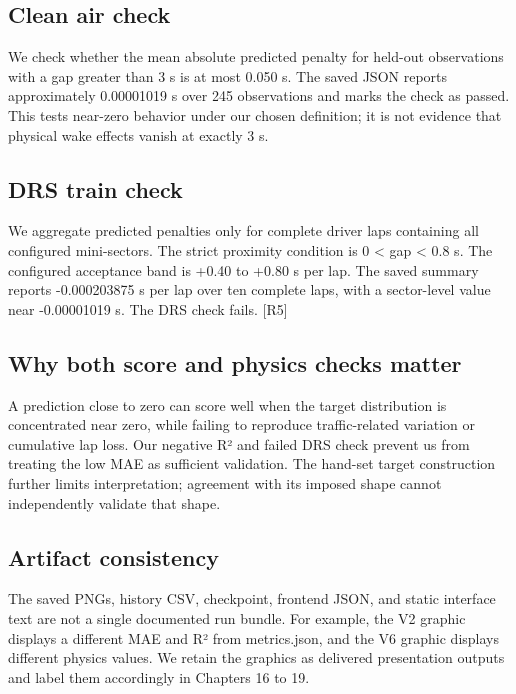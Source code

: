 \documentclass[11pt,a4paper,oneside]{report}
\begin{document}
\subsection*{Clean air check}

We check whether the mean absolute predicted penalty for held-out observations with a gap greater than 3 s is at most 0.050 s. The saved JSON reports approximately 0.00001019 s over 245 observations and marks the check as passed. This tests near-zero behavior under our chosen definition; it is not evidence that physical wake effects vanish at exactly 3 s.

\subsection*{DRS train check}

We aggregate predicted penalties only for complete driver laps containing all configured mini-sectors. The strict proximity condition is 0 < gap < 0.8 s. The configured acceptance band is +0.40 to +0.80 s per lap. The saved summary reports -0.000203875 s per lap over ten complete laps, with a sector-level value near -0.00001019 s. The DRS check fails. [R5]

\subsection*{Why both score and physics checks matter}

A prediction close to zero can score well when the target distribution is concentrated near zero, while failing to reproduce traffic-related variation or cumulative lap loss. Our negative R² and failed DRS check prevent us from treating the low MAE as sufficient validation. The hand-set target construction further limits interpretation; agreement with its imposed shape cannot independently validate that shape.

\subsection*{Artifact consistency}

The saved PNGs, history CSV, checkpoint, frontend JSON, and static interface text are not a single documented run bundle. For example, the V2 graphic displays a different MAE and R² from metrics.json, and the V6 graphic displays different physics values. We retain the graphics as delivered presentation outputs and label them accordingly in Chapters 16 to 19.
\end{document}

